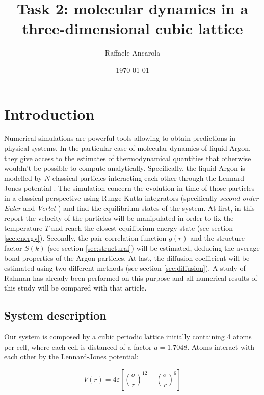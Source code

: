 \documentclass[12pt,english]{smfart}
\title{Task 2: molecular dynamics in a three-dimensional cubic lattice}
\date {\today}
\author{Raffaele Ancarola}
\begin{document}
\def\smfbyname{}

\maketitle

\tableofcontents

\section{Introduction}
\label{intro}
\noindent 
Numerical simulations are powerful tools allowing to obtain predictions in physical systems. 
In the particular case of molecular dynamics of liquid Argon, they give access to the estimates of thermodynamical quantities 
that otherwise wouldn't be possible to compute analytically. 
Specifically, the liquid Argon is modelled by $N$ classical particles interacting each other through the Lennard-Jones potential \cite{Rahman}. The simulation concern the evolution in time of those particles in a classical perspective using Runge-Kutta integrators (specifically \textit{second order Euler} and \textit{Verlet} \cite{course031}) and find the equilibrium states of the system.
At first, in this report the velocity of the particles will be manipulated in order to fix the temperature $T$ and reach the closest equilibrium energy state (see section \ref{sec:energy}). 
Secondly, the pair correlation function $g(r)$ and the structure factor $S(k)$ (see section \ref{sec:structural}) will be estimated, deducing the average bond properties of the Argon particles.
At last, the diffusion coefficient will be estimated using two different methods (see section \ref{sec:diffusion}).
A study of Rahman \cite{Rahman} has already been performed on this purpose and all numerical results of this study will be compared with that article.

\subsection{System description}
\noindent Our system is composed by a cubic periodic lattice initially containing 4 atoms per cell, where each cell is distanced of a factor $a = 1.7048$. Atoms interact with each other by the Lennard-Jones potential:

\begin{equation} \label{lennardjones}
V(r) = 4 \varepsilon \left[\left(\frac{\sigma}{r}\right)^{12} - \left(\frac{\sigma}{r}\right)^{6}\right] 
\end{equation}
\end{document}
